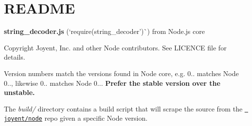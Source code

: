 \chapter{README}
\hypertarget{md__c_1_2_users_2_s_t_r_i_d_e_r_2source_2repos_2_ainslie_a_p_i_2wwwroot_2lib_2jquery-ui_2node__m70195785bc97ce866afb00c8c2357804}{}\label{md__c_1_2_users_2_s_t_r_i_d_e_r_2source_2repos_2_ainslie_a_p_i_2wwwroot_2lib_2jquery-ui_2node__m70195785bc97ce866afb00c8c2357804}
{\bfseries{string\+\_\+decoder.\+js}} (`require(\textquotesingle{}string\+\_\+decoder')\`{}) from Node.\+js core

Copyright Joyent, Inc. and other Node contributors. See LICENCE file for details.

Version numbers match the versions found in Node core, e.\+g. 0.. matches Node 0.., likewise 0.. matches Node 0... {\bfseries{Prefer the stable version over the unstable.}}

The {\itshape build/} directory contains a build script that will scrape the source from the \href{https://github.com/joyent/node}{\texttt{ joyent/node}} repo given a specific Node version. 